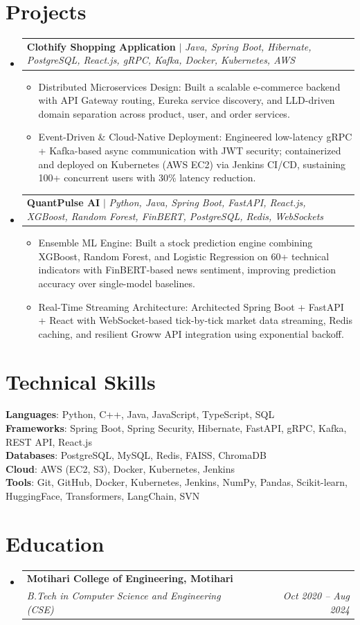 \documentclass[10pt, letterpaper]{article}
\makeatletter
\newcommand{\resumeItem}[1]{
  \item\small{
    {#1 \vspace{-2pt}}
  }
}
\newcommand{\resumeSubheading}[4]{
  \vspace{-2pt}\item
    \begin{tabular*}{1.0\textwidth}[t]{l@{\extracolsep{\fill}}r}
      \textbf{#1} & \textbf{\small #2} \\
      \textit{\small#3} & \textit{\small #4} \\
    \end{tabular*}\vspace{-7pt}
}
\newcommand{\resumeProjectHeading}[2]{
    \item
    \begin{tabular*}{1.0\textwidth}{l@{\extracolsep{\fill}}r}
      \small#1 & \textbf{\small #2} \\
    \end{tabular*}\vspace{-7pt}
}
\newcommand{\resumeSubHeadingListStart}{\begin{itemize}[leftmargin=0.0in, label={}]}
\newcommand{\resumeSubHeadingListEnd}{\end{itemize}}
\newcommand{\resumeItemListStart}{\begin{itemize}[leftmargin=0.15in]}
\newcommand{\resumeItemListEnd}{\end{itemize}\vspace{-5pt}}
\makeatother
\begin{document}
\section{Projects}
\resumeSubHeadingListStart
  \resumeProjectHeading{\textbf{Clothify Shopping Application} $|$ \emph{Java, Spring Boot, Hibernate, PostgreSQL, React.js, gRPC, Kafka, Docker, Kubernetes, AWS}}{}
    \resumeItemListStart
      \resumeItem{Distributed Microservices Design: Built a scalable e-commerce backend with API Gateway routing, Eureka service discovery, and LLD-driven domain separation across product, user, and order services.}
      \resumeItem{Event-Driven \& Cloud-Native Deployment: Engineered low-latency gRPC + Kafka-based async communication with JWT security; containerized and deployed on Kubernetes (AWS EC2) via Jenkins CI/CD, sustaining 100+ concurrent users with 30\% latency reduction.}
    \resumeItemListEnd
  \resumeProjectHeading{\textbf{QuantPulse AI} $|$ \emph{Python, Java, Spring Boot, FastAPI, React.js, XGBoost, Random Forest, FinBERT, PostgreSQL, Redis, WebSockets}}{}
    \resumeItemListStart
      \resumeItem{Ensemble ML Engine: Built a stock prediction engine combining XGBoost, Random Forest, and Logistic Regression on 60+ technical indicators with FinBERT-based news sentiment, improving prediction accuracy over single-model baselines.}
      \resumeItem{Real-Time Streaming Architecture: Architected Spring Boot + FastAPI + React with WebSocket-based tick-by-tick market data streaming, Redis caching, and resilient Groww API integration using exponential backoff.}
    \resumeItemListEnd
\resumeSubHeadingListEnd


\section{Technical Skills}
\begin{itemize}[leftmargin=0.15in, label={}]
  \small{\item{
    \textbf{Languages}{: Python, C++, Java, JavaScript, TypeScript, SQL} \\
    \textbf{Frameworks}{: Spring Boot, Spring Security, Hibernate, FastAPI, gRPC, Kafka, REST API, React.js} \\
    \textbf{Databases}{: PostgreSQL, MySQL, Redis, FAISS, ChromaDB} \\
    \textbf{Cloud}{: AWS (EC2, S3), Docker, Kubernetes, Jenkins} \\
    \textbf{Tools}{: Git, GitHub, Docker, Kubernetes, Jenkins, NumPy, Pandas, Scikit-learn, HuggingFace, Transformers, LangChain, SVN} \\
  }}
\end{itemize}


\section{Education}
\resumeSubHeadingListStart
  \resumeSubheading{Motihari College of Engineering, Motihari}{}{B.Tech in Computer Science and Engineering (CSE)}{Oct 2020 -- Aug 2024}
\resumeSubHeadingListEnd
\end{document}
